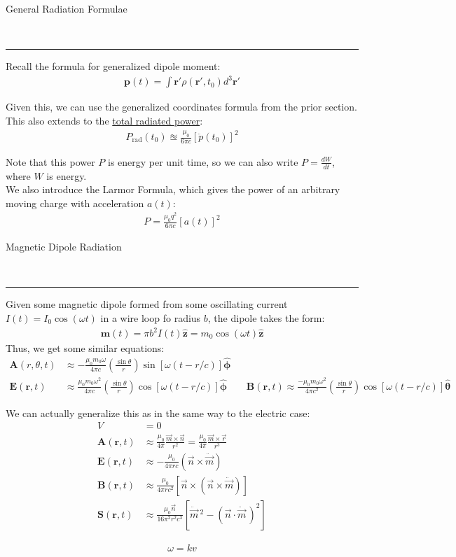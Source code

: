 \documentclass{article}
\newcommand{\header}[1]{\begin{large}\noindent #1\end{large}\\\rule{\textwidth}{0.5pt}}
\newcommand{\gap}{\medskip\\}
\begin{document}
\header{General Radiation Formulae}
Recall the formula for generalized dipole moment:
\begin{align*}
    \mathbf{p}(t) = \int \mathbf{r}' \rho(\mathbf{r}', t_0) d^3 \mathbf{r}'
\end{align*}

Given this, we can use the generalized coordinates formula from the prior section.
\gap
This also extends to the \underline{total radiated power}:
\begin{align*}
    P_\textrm{rad}(t_0) \approxeq \frac{\mu_0}{6\pi c}\left[\ddot{p}(t_0)\right]^2
\end{align*}

Note that this power $P$ is energy per unit time, so we can also write $P = \frac{dW}{dt}$, where $W$ is energy.
\gap 
We also introduce the Larmor Formula, which gives the power of an arbitrary moving charge 
with acceleration $a(t)$:
\begin{align*}
    P = \frac{\mu_0q^2}{6\pi c}[a(t)]^2
\end{align*}
\pagebreak

\header{Magnetic Dipole Radiation}
Given some magnetic dipole formed from some oscillating current $I(t) = I_0 \cos(\omega t)$ in a wire loop fo radius $b$,
the dipole takes the form:
\begin{align*}
    \mathbf{m}(t) = \pi b^2 I(t)\pmb{\hat{z}} = m_0 \cos(\omega t)\pmb{\hat{z}}
\end{align*}
Thus, we get some similar equations:
\begin{align*}
    \mathbf{A}(r, \theta, t) &\approx - \frac{\mu_0 m_0 \omega}{4\pi c}\left(\frac{\sin\theta}{r}\right)\sin \left[\omega(t-r/c)\right]\pmb{\hat{\phi}}\\
    \mathbf{E}(\mathbf{r}, t) &\approx \frac{\mu_0 m_0 \omega^2}{4\pi c} \left(\frac{\sin \theta}{r}\right) \cos\left[\omega(t- r/c)\right]\pmb{\hat{\phi}} &&
    \mathbf{B}(\mathbf{r}, t) \approx \frac{-\mu_0 m_0 \omega^2}{4\pi c^2}\left(\frac{\sin \theta}{r}\right) \cos \left[\omega(t- r/c)\right] \pmb{\hat{\theta}}
\end{align*}

We can actually generalize this as in the same way to the electric case:
\begin{align*}
    V &= 0\\
    \mathbf{A}(\mathbf{r}, t) &\approx \frac{\mu_0}{4\pi}\frac{\vec{m} \times \vec{n}}{r^2} = \frac{\mu_0}{4\pi} \frac{\vec{m} \times \vec{r}}{r^3}\\
    \mathbf{E}(\mathbf{r}, t) &\approx - \frac{\mu_0}{4\pi rc} (\vec{n} \times \ddot{\vec{m}}) \\
    \mathbf{B}(\mathbf{r}, t) &\approx \frac{\mu_0}{4\pi rc^2} \left[\vec{n} \times (\vec{n} \times \ddot{\vec{m}})\right]\\
    \mathbf{S}(\mathbf{r}, t) &\approx \frac{\mu_0\vec{n}}{16\pi^2 r^2 c^3}\left[\ddot{\vec{m}}\,^2 - (\vec{n} \cdot \ddot{\vec{m}}\,)^2\right]
\end{align*}

\begin{align*}
    \omega = kv
\end{align*}
\end{document}
